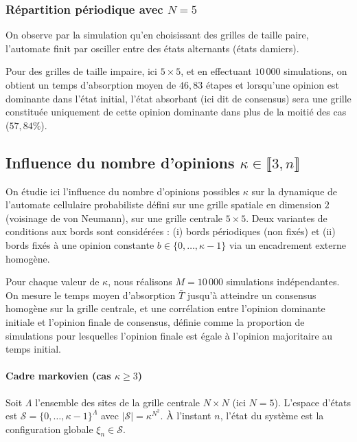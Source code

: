 \documentclass[11pt,a4paper]{article}
\begin{document}
\subsubsection{Répartition périodique avec $N = 5$}

On observe par la simulation qu'en choisissant des grilles de taille
paire, l'automate finit par osciller entre des états alternants (états damiers).

Pour des grilles de taille impaire, ici $5 \times 5$, et en effectuant
$10\,000$ simulations, on obtient un temps d'absorption moyen de
$46{,}83$ étapes et lorsqu'une opinion est dominante dans l'état
initial, l'état absorbant (ici dit de consensus) sera une grille
constituée uniquement de cette opinion dominante dans plus de la
moitié des cas ($57{,}84\%$).

\subsection{Influence du nombre d’opinions $\kappa \in \llbracket 3, n \rrbracket$}

On étudie ici l'influence du nombre d'opinions possibles $\kappa$ sur la dynamique de l'automate
cellulaire probabiliste défini sur une grille spatiale en dimension $2$
(voisinage de von Neumann), sur une grille centrale $5\times 5$.
Deux variantes de conditions aux bords sont considérées :
(i) bords périodiques (non fixés) et
(ii) bords fixés à une opinion constante $b \in \{0,\dots,\kappa-1\}$
via un encadrement externe homogène.

Pour chaque valeur de $\kappa$, nous réalisons $M=10\,000$ simulations
indépendantes.  On mesure le temps moyen d'absorption $\bar{T}$
jusqu'à atteindre un consensus homogène sur la grille centrale, et une
corrélation entre l'opinion dominante initiale et l'opinion finale de
consensus, définie comme la proportion de simulations pour lesquelles
l'opinion finale est égale à l'opinion majoritaire au temps initial.

\paragraph{Cadre markovien (cas $\kappa \ge 3$)}

Soit $\Lambda$ l’ensemble des sites de la grille centrale $N\times N$
(ici $N=5$).  L’espace d’états est
$\mathcal{S}=\{0,\dots,\kappa-1\}^{\Lambda}$ avec
$|\mathcal{S}|=\kappa^{N^2}$. À l’instant $n$, l’état du système est
la configuration globale $\xi_n \in \mathcal{S}$.
\end{document}
